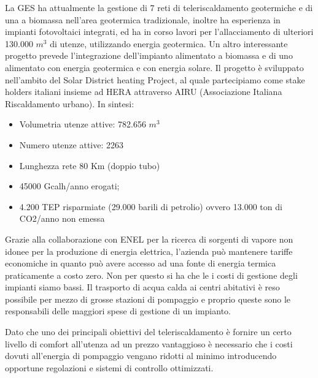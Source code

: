 \documentclass[laurea,oneside,11pt]{USiena_tesiLM}
\begin{document}
La GES ha attualmente la gestione di 7 reti di teleriscaldamento geotermiche e di una a biomassa nell'area geotermica tradizionale, inoltre ha esperienza in impianti fotovoltaici integrati, ed ha in corso lavori per l'allacciamento di ulteriori 130.000 $m^3$ di utenze, utilizzando energia geotermica. Un altro interessante progetto prevede l'integrazione dell'impianto alimentato a biomassa e di uno alimentato con energia geotermica e con energia solare. Il progetto è sviluppato nell'ambito del Solar District heating Project, al quale partecipiamo come stake holders italiani insieme ad HERA attraverso AIRU (Associazione Italiana Riscaldamento urbano).
In sintesi:
\begin{itemize}
\item Volumetria utenze attive: 782.656 $m^3$
\item Numero utenze attive: 2263
\item Lunghezza rete 80 Km (doppio tubo)
\item 45000 Gcalh/anno erogati; 
\item 4.200 TEP risparmiate (29.000 barili di petrolio) ovvero 13.000 ton di CO2/anno non emessa
\end{itemize}


Grazie alla collaborazione con ENEL per la ricerca di sorgenti di vapore non idonee per la produzione di energia elettrica, l'azienda può  mantenere tariffe economiche in quanto può avere accesso ad una fonte di energia termica praticamente a costo zero. Non per questo si ha che le i costi di gestione degli impianti siamo bassi. Il trasporto di acqua calda ai centri abitativi è reso possibile per mezzo di grosse stazioni di pompaggio e proprio queste sono le responsabili delle maggiori spese di gestione di un impianto. 

Dato che uno dei principali obiettivi del teleriscaldamento è fornire un certo livello di comfort all'utenza ad un prezzo vantaggioso è necessario che i costi dovuti all'energia di pompaggio vengano ridotti al minimo introducendo opportune regolazioni e sistemi di controllo ottimizzati. 
\end{document}
